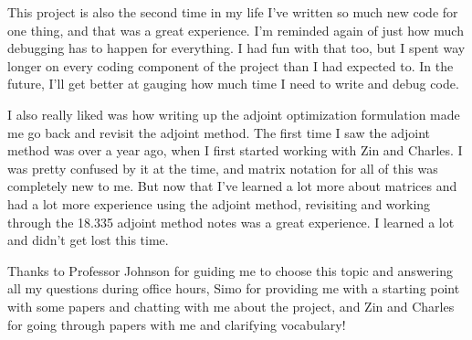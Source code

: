 \documentclass[%
 reprint,
 amsmath,amssymb,
 aps
]{revtex4-2}
\begin{document}
This project is also the second time in my life I've written so much new code for one thing, and that was a great experience. I'm reminded again of just how much debugging has to happen for everything. I had fun with that too, but I spent way longer on every coding component of the project than I had expected to. In the future, I'll get better at gauging how much time I need to write and debug code. 

I also really liked was how writing up the adjoint optimization formulation made me go back and revisit the adjoint method. The first time I saw the adjoint method was over a year ago, when I first started working with Zin and Charles. I was pretty confused by it at the time, and matrix notation for all of this was completely new to me. But now that I've learned a lot more about matrices and had a lot more experience using the adjoint method, revisiting and working through the 18.335 adjoint method notes was a great experience. I learned a lot and didn't get lost this time.

Thanks to Professor Johnson for guiding me to choose this topic and answering all my questions during office hours, Simo for providing me with a starting point with some papers and chatting with me about the project, and Zin and Charles for going through papers with me and clarifying vocabulary!
\newpage

\end{document}

